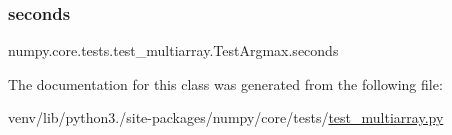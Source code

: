 \subsubsection{\texorpdfstring{seconds}{seconds}}
{\footnotesize\ttfamily numpy.\+core.\+tests.\+test\+\_\+multiarray.\+Test\+Argmax.\+seconds\hspace{0.3cm}{\ttfamily [static]}}



The documentation for this class was generated from the following file\+:\begin{DoxyCompactItemize}
\item 
venv/lib/python3./site-\/packages/numpy/core/tests/\hyperlink{core_2tests_2test__multiarray_8py}{test\+\_\+multiarray.\+py}\end{DoxyCompactItemize}
